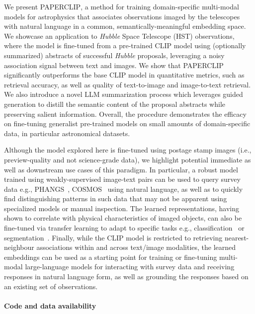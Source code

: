 \documentclass[10pt]{article} %
\newcommand{\hubble}{\emph{Hubble}\xspace}
\begin{document}
We present \textsc{PAPERCLIP}, a method for training domain-specific multi-modal models for astrophysics that associates observations imaged by the telescopes with natural language in a common, semantically-meaningful embedding space.
%
We showcase an application to \hubble Space Telescope (HST) observations, where the model is fine-tuned from a pre-trained CLIP model using (optionally summarized) abstracts of successful \hubble proposals, leveraging a noisy association signal between text and images.
%
We show that \textsc{PAPERCLIP} significantly outperforms the base CLIP model in quantitative metrics, such as retrieval accuracy, as well as quality of text-to-image and image-to-text retrieval.
%
We also introduce a novel LLM summarization process which leverages guided generation to distill the semantic content of the proposal abstracts while preserving salient information. 
%
Overall, the procedure demonstrates the efficacy on fine-tuning generalist pre-trained models on small amounts of domain-specific data, in particular astronomical datasets.

Although the model explored here is fine-tuned using postage stamp images (i.e., preview-quality and not science-grade data), we highlight potential immediate as well as downstream use cases of this paradigm.
%
In particular, a robust model trained using weakly-supervised image-text pairs can be used to query survey data e.g., PHANGS~\citep{lee2022phangs}, COSMOS~\citep{scoville2007cosmic} using natural language, as well as to quickly find distinguishing patterns in such data that may not be apparent using specialized models or manual inspection.
%
The learned representations, having shown to correlate with physical characteristics of imaged objects, can also be fine-tuned via transfer learning to adapt to specific tasks e.g., classification~\citep{wei2020deep} or segmentation~\citep{hausen2020morpheus}.
%
Finally, while the CLIP model is restricted to retrieving nearest-neighbour associations within and across text/image modalities, the learned embeddings can be used as a starting point for training or fine-tuning multi-modal large-language models for interacting with survey data and receiving responses in natural language form, as well as grounding the responses based on an existing set of observations.

\paragraph*{Code and data availability}
\end{document}
